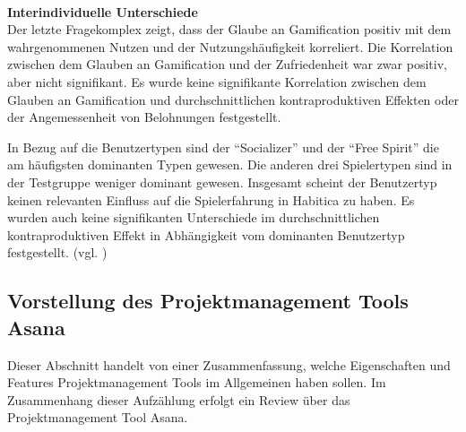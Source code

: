\documentclass[sigconf, nonacm]{acmart}
\begin{document}
\\
\textbf{Interindividuelle Unterschiede}
\\
Der letzte Fragekomplex zeigt, dass der Glaube an Gamification positiv mit dem wahrgenommenen Nutzen und der Nutzungshäufigkeit korreliert. Die Korrelation zwischen dem Glauben an Gamification und der Zufriedenheit war zwar positiv, aber nicht signifikant. Es wurde keine signifikante Korrelation zwischen dem Glauben an Gamification und durchschnittlichen kontraproduktiven Effekten oder der Angemessenheit von Belohnungen festgestellt.

In Bezug auf die Benutzertypen sind der \enquote{Socializer} und der \enquote{Free Spirit} die am häufigsten dominanten Typen gewesen. Die anderen drei Spielertypen sind in der Testgruppe weniger dominant gewesen. Insgesamt scheint der Benutzertyp keinen relevanten Einfluss auf die Spielerfahrung in Habitica zu haben. Es wurden auch keine signifikanten Unterschiede im durchschnittlichen kontraproduktiven Effekt in Abhängigkeit vom dominanten Benutzertyp festgestellt. (vgl. \cite{diefenbach_counterproductive_2019})

\subsection{Vorstellung des Projektmanagement Tools Asana}\label{sec:asana}
Dieser Abschnitt handelt von einer Zusammenfassung, welche Eigenschaften und Features Projektmanagement Tools im Allgemeinen haben sollen. Im Zusammenhang dieser Aufzählung erfolgt ein Review über das Projektmanagement Tool Asana.
\end{document}
